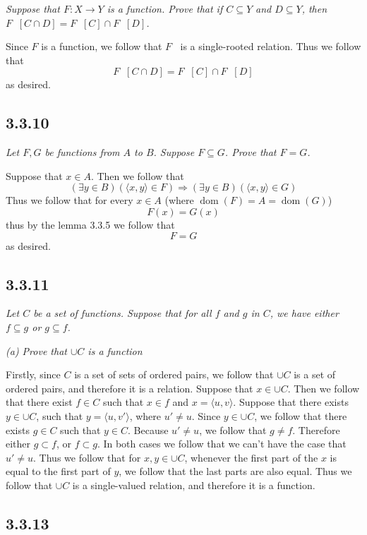 \documentclass[11pt,oneside,titlepage]{book}
\DeclareMathOperator \inv {^{-1}}
\DeclareMathOperator \ra {\Rightarrow}
\DeclareMathOperator \dom {dom}
\newcommand{\eangle}[1]{\langle #1 \rangle}
\begin{document}
\textit{Suppose that $F: X \to Y$ is a function. Prove that if $C \subseteq Y$ and
  $D \subseteq Y$, then $F\inv[C \cap D] = F\inv[C] \cap F\inv[D]$.}

Since $F$ is a function, we follow that $F\inv$ is a single-rooted relation. Thus we follow that
$$F\inv[C \cap D] = F\inv[C] \cap F\inv[D]$$
as desired.

\subsection*{3.3.10}

\textit{Let $F, G$ be functions from $A$ to $B$. Suppose $F \subseteq G$. Prove that $F = G$.}

Suppose that $x \in A$. Then we follow that
$$(\exists y \in B)(\eangle{x, y} \in F) \ra (\exists y \in B)(\eangle{x, y} \in G)$$
Thus we follow that for every $x \in A$ (where $\dom (F) = A = \dom(G)$)
$$F(x) = G(x)$$
thus by the lemma 3.3.5 we follow that
$$F = G$$
as desired.


\subsection*{3.3.11}

\textit{Let $C$ be a set of functions. Suppose that for all $f$ and $g$ in $C$, we have either
  $f \subseteq g$ or $g \subseteq f$. }

\textit{(a) Prove that $\cup C$ is a function}

Firstly, since $C$ is a set of sets of ordered pairs, we follow that $\cup C$ is a set of
ordered pairs, and therefore it is a relation. Suppose that $x \in \cup C$. Then we follow that
there exist  $f \in C$ such that $x \in f$ and 
$x = \eangle{u, v}$. Suppose that there exists $y \in \cup C$, such that $y = \eangle{u, v'}$,
where $u' \neq u$. Since $y \in \cup C$, we follow that there exists $g \in C$ such that
$y \in C$. Because $u' \neq u$, we follow that $g \neq f$. Therefore either $g \subset f$,
or $f \subset g$. In both cases we follow that we can't have the case that $u' \neq u$. Thus
we follow that for $x, y \in \cup C$, whenever the first part of the $x$ is equal to the first
part of $y$, we follow that the last parts are also equal. Thus we follow that $\cup C$ is
a single-valued relation, and therefore it is a function.

\subsection*{3.3.13}
\end{document}

